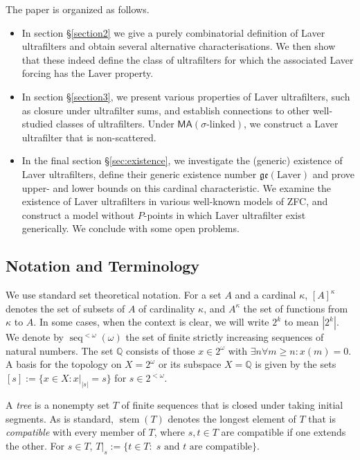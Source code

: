 \documentclass[12pt]{article}
\theoremstyle{definition}
\newcommand\seq{\operatorname{seq}}
\begin{document}
The paper is organized as follows.
\begin{itemize}
    \item In section \S\ref{section2} we give a purely combinatorial definition of Laver ultrafilters and obtain several alternative characterisations. We then show that these indeed define the class of ultrafilters for which the associated Laver forcing has the Laver property.
    \item In section \S\ref{section3}, we present various properties of Laver ultrafilters, such as closure under ultrafilter sums, and establish connections to other well-studied classes of ultrafilters. Under $\textsf{MA}(\text{$\sigma$-linked})$, we construct a Laver ultrafilter that is non-scattered.
    \item In the final section \S\ref{sec:existence}, we investigate the (generic) existence of Laver ultrafilters, define their generic existence number $\mathfrak{ge}(\text{Laver})$ and prove upper- and lower bounds on this cardinal characteristic. We examine the existence of Laver ultrafilters in various well-known models of \textsf{ZFC}, and construct a model without $P$-points in which Laver ultrafilter exist generically. We conclude with some open problems.
\end{itemize}

\subsection*{Notation and Terminology}
We use standard set theoretical notation. For a set $A$ and a cardinal $\kappa$, $[A]^{\kappa}$ denotes the set of subsets of $A$ of cardinality $\kappa$, and $A^\kappa$  the set of functions from $\kappa$ to $A$. In some cases, when the context is clear, we will write $2^k$ to mean $|2^k|$. We denote by $\seq^{<\omega}(\omega)$ the set of finite strictly increasing sequences of natural numbers. The set $\mathbb{Q}$ consists of those $x\in 2^\omega$ with $\exists n \forall m \geq n: x(m)=0$. A basis for the topology on $X=2^\omega$ or its subspace $X=\mathbb{Q}$ is given by the sets $[s]:=\{x \in X: x|_{|s|}=s\}$ for $s\in 2^{<\omega}$.

A \emph{tree} is a nonempty set $T$ of finite sequences that is closed under taking initial segments. As is standard, $\operatorname{stem}(T)$ denotes the longest element of $T$ that is \emph{compatible} with every member of $T$, where $s,t\in T$ are compatible if one extends the other. For $s\in T$, $T|_s:=\{t\in T : \; \text{$s$ and $t$ are compatible}\}$.
\end{document}
